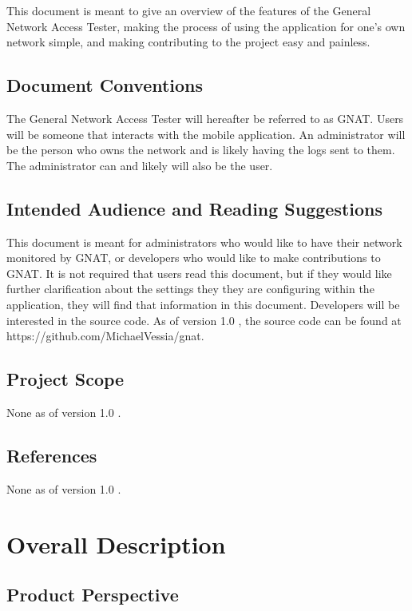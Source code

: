 \documentclass{scrreprt}
\def\myversion{1.0 }
\def\sourcecode{https://github.com/MichaelVessia/gnat}
\begin{document}
This document is meant to give an overview of the features of the General Network Access Tester, making the process of using the application for one's own network simple, and making contributing to the project easy and painless.

\section{Document Conventions}
The General Network Access Tester will hereafter be referred to as GNAT. Users will be someone that interacts with the mobile application.  An administrator will be the person who owns the network and is likely having the logs sent to them.  The administrator can and likely will also be the user.

\section{Intended Audience and Reading Suggestions}
This document is meant for administrators who would like to have their network monitored by GNAT, or developers who would like to make contributions to GNAT. It is not required that users read this document, but if they would like further clarification about the settings they they are configuring within the application, they will find that information in this document.  Developers will be interested in the source code. As of version \myversion, the source code can be found at \sourcecode.

\section{Project Scope}

None as of version \myversion.

\section{References}

None as of version \myversion.

\chapter{Overall Description}

\section{Product Perspective}
\end{document}
